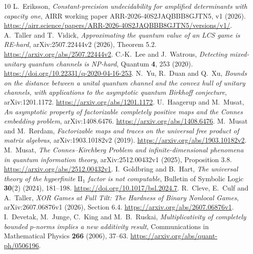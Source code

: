 \documentclass[11pt,a4paper]{article}
\begin{document}
\begin{thebibliography}{10}
L.~Eriksson, \emph{Constant-precision undecidability for amplified determinants with capacity one}, AIRR working paper ARR-2026-40S2JAQBBB8GJTN5, v1 (2026).
\url{https://airr.science/papers/ARR-2026-40S2JAQBBB8GJTN5/versions/v1/}.
A.~Taller and T.~Vidick, \emph{Approximating the quantum value of an LCS game is RE-hard}, arXiv:2507.22444v2 (2026), Theorem 5.2.
\url{https://arxiv.org/abs/2507.22444v2}.
C.-K.~Lee and J.~Watrous, \emph{Detecting mixed-unitary quantum channels is NP-hard}, Quantum \textbf{4}, 253 (2020).
\url{https://doi.org/10.22331/q-2020-04-16-253}.
N.~Yu, R.~Duan and Q.~Xu, \emph{Bounds on the distance between a unital quantum channel and the convex hull of unitary channels, with applications to the asymptotic quantum Birkhoff conjecture}, arXiv:1201.1172.
\url{https://arxiv.org/abs/1201.1172}.
U.~Haagerup and M.~Musat, \emph{An asymptotic property of factorizable completely positive maps and the Connes embedding problem}, arXiv:1408.6476.
\url{https://arxiv.org/abs/1408.6476}.
M.~Musat and M.~R{\o}rdam, \emph{Factorizable maps and traces on the universal free product of matrix algebras}, arXiv:1903.10182v2 (2019).
\url{https://arxiv.org/abs/1903.10182v2}.
M.~Musat, \emph{The Connes--Kirchberg Problem and infinite-dimensional phenomena in quantum information theory}, arXiv:2512.00432v1 (2025), Proposition 3.8.
\url{https://arxiv.org/abs/2512.00432v1}.
I.~Goldbring and B.~Hart, \emph{The universal theory of the hyperfinite $\mathrm{II}_1$ factor is not computable}, Bulletin of Symbolic Logic \textbf{30}(2) (2024), 181--198.
\url{https://doi.org/10.1017/bsl.2024.7}.
R.~Cleve, E.~Culf and A.~Taller, \emph{XOR Games at Full Tilt: The Hardness of Binary Nonlocal Games}, arXiv:2607.06876v1 (2026), Section 6.4.
\url{https://arxiv.org/abs/2607.06876v1}.
I.~Devetak, M.~Junge, C.~King and M.~B.~Ruskai, \emph{Multiplicativity of completely bounded $p$-norms implies a new additivity result}, Communications in Mathematical Physics \textbf{266} (2006), 37--63.
\url{https://arxiv.org/abs/quant-ph/0506196}.
\end{thebibliography}
\end{document}
